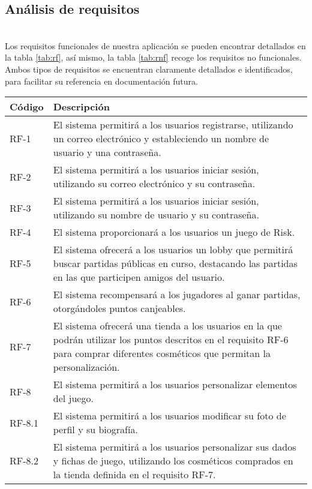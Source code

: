 \documentclass[11pt, a4paper, titlepage]{article}
\begin{document}
\subsection{Análisis de requisitos}
\\ Los requisitos funcionales de nuestra aplicación se pueden encontrar detallados en la tabla \ref{tab:rf}, así mismo, la tabla \ref{tab:rnf} recoge los requisitos no funcionales. Ambos tipos de requisitos se encuentran claramente detallados e identificados, para facilitar su referencia en documentación futura.
\begin{longtable}
    \centering
    \begin{tabularx}{\textwidth}{|l|X|}
    \hline
         Código & Descripción  \\
         \hline
         RF-1 & El sistema permitirá a los usuarios registrarse, utilizando un correo electrónico y estableciendo un nombre de usuario y una contraseña.\\
         RF-2 & El sistema permitirá a los usuarios iniciar sesión, utilizando su correo electrónico y su contraseña.\\
         RF-3 & El sistema permitirá a los usuarios iniciar sesión, utilizando su nombre de usuario y su contraseña.\\
         RF-4 & El sistema proporcionará a los usuarios un juego de Risk.\\
         RF-5 & El sistema ofrecerá a los usuarios un lobby que permitirá buscar partidas públicas en curso, destacando las partidas en las que participen amigos del usuario.\\
         RF-6 & El sistema recompensará a los jugadores al ganar partidas, otorgándoles puntos canjeables.\\
         RF-7 & El sistema ofrecerá una tienda a los usuarios en la que podrán utilizar los puntos descritos en el requisito RF-6 para comprar diferentes cosméticos que permitan la personalización. \\
         RF-8 & El sistema permitirá a los usuarios personalizar elementos del juego.\\
         RF-8.1 & El sistema permitirá a los usuarios modificar su foto de perfil y su biografía.\\
         RF-8.2 & El sistema permitirá a los usuarios personalizar sus dados y fichas de juego, utilizando los cosméticos comprados en la tienda definida en el requisito RF-7.\\

\end{tabularx}
\end{longtable}
\end{document}
